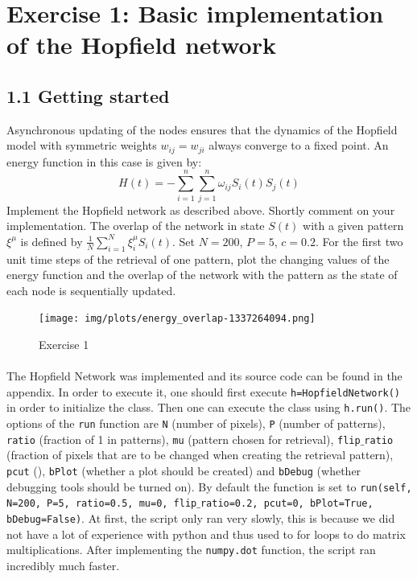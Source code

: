 \section{Exercise 1: Basic implementation of the Hopfield network}
\subsection{1.1 Getting started}

\begin{itshape}
\small
Asynchronous updating of the nodes ensures that the dynamics of the Hopfield model with symmetric weights $w_{ij} = w_{ji}$ always converge to a fixed point. An energy function in this case is given by:
\begin{equation}
H(t)=-\sum_{i=1}^n \sum_{j=1}^n \omega_{ij} S_i(t) S_j(t)
\label{eq: energy function}
\end{equation}
Implement the Hopfield network as described above. Shortly comment on your implementation. The overlap of the network in state $S(t)$ with a given pattern $\xi^{\mu}$ is defined by $\frac{1}{N}\sum_{i=1}^N \xi_i^{\mu} 	S_i(t)$. Set $N = 200$, $P = 5$, $c = 0.2$. For the first two unit time steps of the retrieval of one pattern, plot the changing values of the energy function and the overlap of the network with the pattern as the state of each node is sequentially updated.
\end{itshape}

\begin{figure}
  \vspace{-20pt}
  \begin{center}
    \texttt{[image: img/plots/energy\_overlap-1337264094.png]}
  \end{center}
  \vspace{-20pt}
  \caption{Exercise 1	}
  \label{fig: Question 1.1}
  \vspace{-10pt}
\end{figure}
\paragraph*{}

\normalsize
The Hopfield Network was implemented and its source code can be found in the appendix. In order to execute it, one should first execute \texttt{h=HopfieldNetwork()} in order to initialize the class. Then one can execute the class using \texttt{h.run()}. The options of the \texttt{run} function are \texttt{N} (number of pixels), \texttt{P} (number of patterns), \texttt{ratio} (fraction of 1 in patterns), \texttt{mu} (pattern chosen for retrieval), \texttt{flip$\_$ratio} (fraction of pixels that are to be changed when creating the retrieval pattern), \texttt{pcut} (), \texttt{bPlot} (whether a plot should be created) and \texttt{bDebug} (whether debugging tools should be turned on).
By default the function is set to \texttt{run(self, N=200, P=5, ratio=0.5, mu=0, flip$\_$ratio=0.2, pcut=0, bPlot=True, bDebug=False)}.
At first, the script only ran very slowly, this is because we did not have a lot of experience with python and thus used to for loops to do matrix multiplications. After implementing the \texttt{numpy.dot} function, the script ran incredibly much faster. 

